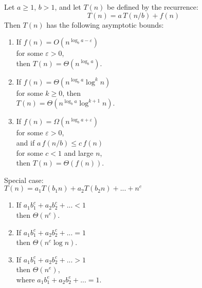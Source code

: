\documentclass[a4paper,landscape]{article}
\begin{document}
\begin{multicols}{7}
\tcolorbox[mybox={Master Theorem}]
Let \( a \geq 1 \), \( b > 1 \), and let \( T(n) \) be defined by the recurrence:
\[T(n) = a\,T(n/b) + f(n)\]
Then \( T(n) \) has the following asymptotic bounds:
\begin{enumerate}[noitemsep, topsep=0pt]
    \item If \( f(n) = O(n^{\log_b a - \varepsilon}) \) \\ for some \( \varepsilon > 0 \),\\
          then \( T(n) = \Theta(n^{\log_b a}) \).

    \item If \( f(n) = \Theta(n^{\log_b a} \log^k n) \) \\ for some \( k \geq 0 \),
          then \\ \( T(n)=\Theta(n^{\log_b a}\log^{k+1}n) \).

    \item If \( f(n) = \Omega(n^{\log_b a + \varepsilon}) \) \\ for some \( \varepsilon > 0 \),\\
          and if \( a\,f(n/b) \leq c\,f(n) \) \\ for some \( c < 1 \) and large \( n \),\\
          then \( T(n) = \Theta(f(n)) \).
\end{enumerate}
\tcblower
Special case:\\
\(T(n) = a_1T(b_1n) + a_2T(b_2n) + ... + n^c\)
\begin{enumerate}[noitemsep, topsep=0pt]
    \item If \(a_1b_1^c + a_2b_2^c + ...  < 1 \) \\ \hspace*{2mm} then \( \Theta(n^c)\).
    \item If \(a_1b_1^c + a_2b_2^c + ...  = 1\) \\ \hspace*{2mm} then \( \Theta(n^c \log n)\).
    \item If \(a_1b_1^c + a_2b_2^c + ...  > 1 \) \\ \hspace*{2mm} then \( \Theta(n^e)\), \\ \hspace*{2mm} where \(a_1b_1^e + a_2b_2^e + ... = 1\).
\end{enumerate}
\endtcolorbox


\end{multicols}
\end{document}
